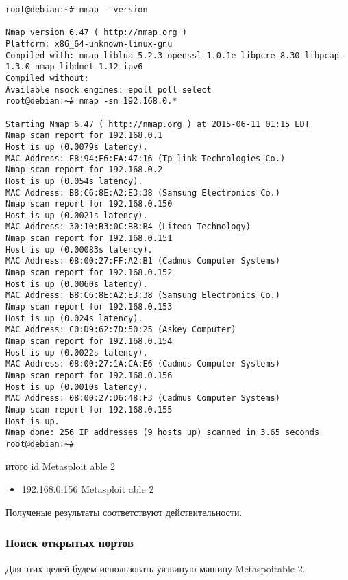 \documentclass[10pt,a4paper]{article}
\begin{document}
\begin{verbatim}
root@debian:~# nmap --version

Nmap version 6.47 ( http://nmap.org )
Platform: x86_64-unknown-linux-gnu
Compiled with: nmap-liblua-5.2.3 openssl-1.0.1e libpcre-8.30 libpcap-1.3.0 nmap-libdnet-1.12 ipv6
Compiled without:
Available nsock engines: epoll poll select
root@debian:~# nmap -sn 192.168.0.*

Starting Nmap 6.47 ( http://nmap.org ) at 2015-06-11 01:15 EDT
Nmap scan report for 192.168.0.1
Host is up (0.0079s latency).
MAC Address: E8:94:F6:FA:47:16 (Tp-link Technologies Co.)
Nmap scan report for 192.168.0.2
Host is up (0.054s latency).
MAC Address: B8:C6:8E:A2:E3:38 (Samsung Electronics Co.)
Nmap scan report for 192.168.0.150
Host is up (0.0021s latency).
MAC Address: 30:10:B3:0C:BB:B4 (Liteon Technology)
Nmap scan report for 192.168.0.151
Host is up (0.00083s latency).
MAC Address: 08:00:27:FF:A2:B1 (Cadmus Computer Systems)
Nmap scan report for 192.168.0.152
Host is up (0.0060s latency).
MAC Address: B8:C6:8E:A2:E3:38 (Samsung Electronics Co.)
Nmap scan report for 192.168.0.153
Host is up (0.024s latency).
MAC Address: C0:D9:62:7D:50:25 (Askey Computer)
Nmap scan report for 192.168.0.154
Host is up (0.0022s latency).
MAC Address: 08:00:27:1A:CA:E6 (Cadmus Computer Systems)
Nmap scan report for 192.168.0.156
Host is up (0.0010s latency).
MAC Address: 08:00:27:D6:48:F3 (Cadmus Computer Systems)
Nmap scan report for 192.168.0.155
Host is up.
Nmap done: 256 IP addresses (9 hosts up) scanned in 3.65 seconds
root@debian:~# 

\end{verbatim}

итого id Metasploit able 2

\begin{itemize}
\item 192.168.0.156  Metasploit able 2
\end{itemize}

Полученые результаты соответствуют действительности.

\subsubsection{Поиск открытых портов}

Для этих целей будем использовать уязвиную машину Metaspoitable 2.
\end{document}
